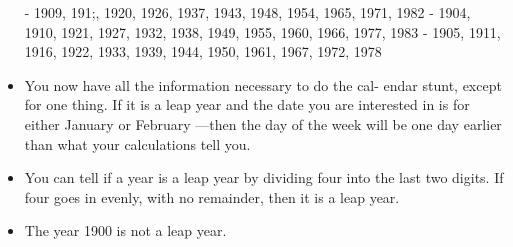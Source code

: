 \begin{itemize}
                 - 1909, 191;, 1920, 1926, 1937, 1943, 1948, 1954, 1965, 1971, 1982
                 - 1904, 1910, 1921, 1927, 1932, 1938, 1949, 1955, 1960, 1966, 1977, 1983
                 - 1905, 1911, 1916, 1922, 1933, 1939, 1944, 1950, 1961, 1967, 1972, 1978
            \item You now have all the information necessary to do the cal-
            endar stunt, except for one thing. If it is a leap year and the
            date you are interested in is for either January or February
            —then the day of the week will be one day earlier than
            what your calculations tell you.
            \item You can tell if a year is a leap year by
            dividing four into the last two digits. If four goes in evenly,
            with no remainder, then it is a leap year.
            \item The year 1900 is not a leap year.
        \end{itemize}


